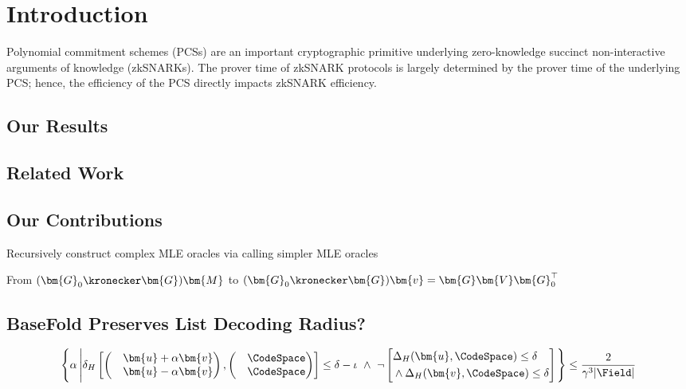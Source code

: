 \section{Introduction}
\label{sec:intro}

Polynomial commitment schemes (PCSs) are an important cryptographic primitive underlying zero-knowledge succinct non-interactive arguments of knowledge (zkSNARKs).
The prover time of zkSNARK protocols is largely determined by the prover time of the underlying PCS;
hence, the efficiency of the PCS directly impacts zkSNARK efficiency.

\subsection{Our Results}
\label{sec:result}

\subsection{Related Work}
\label{sec:related}

\subsection{Our Contributions}
\label{sec:contribution}

Recursively construct complex MLE oracles via calling simpler MLE oracles

From $(\bm{G}_0 \kronecker \bm{G}) \bm{M}$ 
to $(\bm{G}_0 \kronecker \bm{G}) \bm{v} = \bm{G}\bm{V}\bm{G}_0^\top$



\subsection{BaseFold Preserves List Decoding Radius?}

\[
    \left\{
    \alpha
    \left|
    \delta_H \left[
    \begin{pmatrix}
    & \bm{u} + \alpha \bm{v}\\
    & \bm{u} - \alpha \bm{v}
    \end{pmatrix}
    ,
    \begin{pmatrix}
    & \CodeSpace\\
    & \CodeSpace
    \end{pmatrix}
    \right]
    \le \delta - \iota
    ~\wedge~
    \neg\left[
    \begin{aligned}
    & \Delta_H(\bm{u}, \CodeSpace) \le \delta \\
    & \wedge \Delta_H(\bm{v}, \CodeSpace) \le \delta
    \end{aligned}
    \right]
    \right.
    \right\} \le \frac{2}{\gamma^3 |\Field|}
\]


